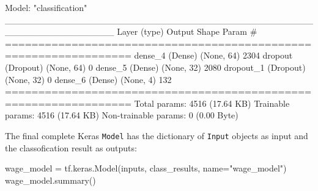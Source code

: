 \begin{samepage}
\begin{textcode}
Model: "classification"
_________________________________________________________________
 Layer (type)                Output Shape              Param #   
=================================================================
 dense_4 (Dense)             (None, 64)                2304      
 dropout (Dropout)           (None, 64)                0         
 dense_5 (Dense)             (None, 32)                2080      
 dropout_1 (Dropout)         (None, 32)                0         
 dense_6 (Dense)             (None, 4)                 132       
=================================================================
Total params: 4516 (17.64 KB)
Trainable params: 4516 (17.64 KB)
Non-trainable params: 0 (0.00 Byte)
\end{textcode}
\end{samepage}

The final complete Keras \texttt{Model} has the dictionary of \texttt{Input} objects as input and the classofication result as outputs:

\begin{samepage}
\begin{pythoncode}
wage_model = tf.keras.Model(inputs, class_results, name="wage_model")
wage_model.summary()
\end{pythoncode}
\end{samepage}

